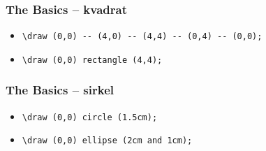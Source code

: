 \documentclass{beamer}
\begin{document}
\begin{frame}[fragile]
\frametitle{The Basics -- kvadrat}
\begin{center}
\end{center}

\vspace{20pt}
\begin{itemize}
\item
\begin{Verbatim}[fontsize=\small]
\draw (0,0) -- (4,0) -- (4,4) -- (0,4) -- (0,0);
\end{Verbatim}

\item
\begin{Verbatim}[fontsize=\small]
\draw (0,0) rectangle (4,4);
\end{Verbatim}
\end{itemize}
\end{frame}

\begin{frame}[fragile]
\frametitle{The Basics -- sirkel}
\begin{center}
\end{center}

\vspace{20pt}

\begin{itemize}
\item
\begin{Verbatim}[fontsize=\small]
\draw (0,0) circle (1.5cm);
\end{Verbatim}

\item
\begin{Verbatim}[fontsize=\small]
\draw (0,0) ellipse (2cm and 1cm);
\end{Verbatim}
\end{itemize}

\end{frame}
\end{document}
